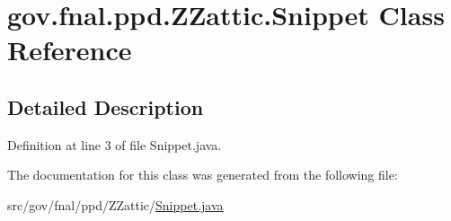\hypertarget{classgov_1_1fnal_1_1ppd_1_1ZZattic_1_1Snippet}{\section{gov.\-fnal.\-ppd.\-Z\-Zattic.\-Snippet Class Reference}
\label{classgov_1_1fnal_1_1ppd_1_1ZZattic_1_1Snippet}
}


\subsection{Detailed Description}


Definition at line 3 of file Snippet.\-java.



The documentation for this class was generated from the following file\-:\begin{DoxyCompactItemize}
\item 
src/gov/fnal/ppd/\-Z\-Zattic/\hyperlink{Snippet_8java}{Snippet.\-java}\end{DoxyCompactItemize}
